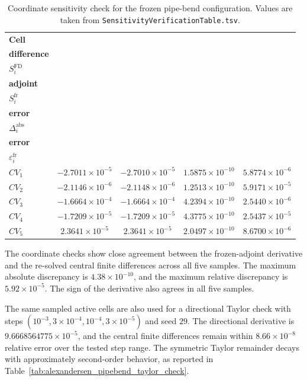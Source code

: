\begin{table}[!ht]
	\centering
	\scriptsize
	\caption{Coordinate sensitivity check for the frozen pipe-bend configuration. Values are taken from \texttt{SensitivityVerificationTable.tsv}.}
	\label{tab:alexandersen_pipebend_fd_adjoint_comparison}
	\renewcommand{\arraystretch}{1.2}
	\begin{tabular}{l c c c c}
		\hline
		\textbf{Cell} &
		\shortstack{\textbf{Finite}\\\textbf{difference}\\$S_i^{\mathrm{FD}}$} &
		\shortstack{\textbf{Frozen}\\\textbf{adjoint}\\$S_i^{\mathrm{fr}}$} &
		\shortstack{\textbf{Absolute}\\\textbf{error}\\$\Delta_i^{\mathrm{abs}}$} &
		\shortstack{\textbf{Relative}\\\textbf{error}\\$\varepsilon_i^{\mathrm{fr}}$} \\
		\hline
			$CV_1$ & $-2.7011\times10^{-5}$ & $-2.7010\times10^{-5}$ & $1.5875\times10^{-10}$ & $5.8774\times10^{-6}$ \\
			$CV_2$ & $-2.1146\times10^{-6}$ & $-2.1148\times10^{-6}$ & $1.2513\times10^{-10}$ & $5.9171\times10^{-5}$ \\
			$CV_3$ & $-1.6664\times10^{-4}$ & $-1.6664\times10^{-4}$ & $4.2394\times10^{-10}$ & $2.5440\times10^{-6}$ \\
			$CV_4$ & $-1.7209\times10^{-5}$ & $-1.7209\times10^{-5}$ & $4.3775\times10^{-10}$ & $2.5437\times10^{-5}$ \\
			$CV_5$ & $ 2.3641\times10^{-5}$ & $ 2.3641\times10^{-5}$ & $2.0497\times10^{-10}$ & $8.6700\times10^{-6}$ \\
		\hline
	\end{tabular}
\end{table}

	The coordinate checks show close agreement between the frozen-adjoint derivative and the re-solved central finite differences across all five samples. The maximum absolute discrepancy is $4.38\times10^{-10}$, and the maximum relative discrepancy is $5.92\times10^{-5}$. The sign of the derivative also agrees in all five samples.

	The same sampled active cells are also used for a directional Taylor check with steps $(10^{-3},3\times10^{-4},10^{-4},3\times10^{-5})$ and seed $29$. The directional derivative is
	$9.6668564775\times10^{-5}$, and the central finite differences remain within $8.66\times10^{-8}$ relative error over the tested step range. The symmetric Taylor remainder decays with approximately second-order behavior, as reported in Table~\ref{tab:alexandersen_pipebend_taylor_check}.

